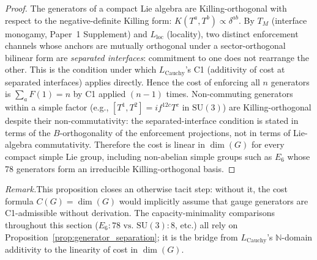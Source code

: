 \documentclass[11pt,a4paper]{article}
\theoremstyle{definition}
\newcommand{\SU}{\mathrm{SU}}
\begin{document}
\begin{proof}
The generators of a compact Lie algebra are Killing-orthogonal with
respect to the negative-definite Killing form: $K(T^a, T^b) \propto
\delta^{ab}$.  By $T_M$ (interface monogamy, Paper~1 Supplement) and
$L_{\mathrm{loc}}$ (locality), two distinct enforcement channels whose
anchors are mutually orthogonal under a sector-orthogonal bilinear form
are \emph{separated interfaces}: commitment to one does not rearrange
the other.  This is the condition under which $L_{\mathrm{Cauchy}}$'s
C1 (additivity of cost at separated interfaces) applies directly.
Hence the cost of enforcing all $n$ generators is $\sum_a F(1) = n$
by C1 applied $(n-1)$ times.  Non-commuting generators within a simple
factor (e.g., $[T^1, T^2] = if^{12c} T^c$ in $\SU(3)$) are
Killing-orthogonal despite their non-commutativity: the separated-interface
condition is stated in terms of the $B$-orthogonality of the enforcement
projections, not in terms of Lie-algebra commutativity.  Therefore the
cost is linear in $\dim(G)$ for every compact simple Lie group,
including non-abelian simple groups such as $E_6$ whose 78 generators
form an irreducible Killing-orthogonal basis.
\end{proof}

\smallskip\noindent\textit{Remark.}\quad This proposition closes an otherwise
tacit step: without it, the cost formula $C(G) = \dim(G)$ would implicitly
assume that gauge generators are C1-admissible without derivation.
The capacity-minimality comparisons throughout this section
($E_6 \colon 78 \text{ vs.\ } \SU(3) \colon 8$, etc.) all rely on
Proposition~\ref{prop:generator_separation}; it is the bridge from
$L_{\mathrm{Cauchy}}$'s $\mathbb{N}$-domain additivity to the linearity
of cost in $\dim(G)$.

%
%
\end{document}
